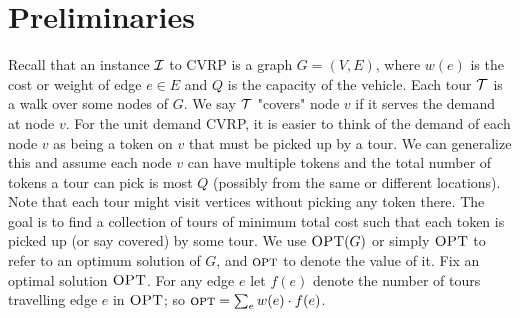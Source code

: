 \documentclass[twoside,leqno]{article}
\newcommand{\calI}{{\cal I}}
\newcommand{\calT}{{\cal T}}
\newcommand{\opt}{\mbox{\sc opt}}
\newcommand{\OPT}{\mbox{\sc OPT}}
\begin{document}
\section{Preliminaries}
Recall that an instance $\calI$ to CVRP is a graph $G = (V,E)$, where $w(e)$ is the cost or weight of edge $e \in E$ and $Q$ is the capacity of the vehicle. Each tour $\calT$ is a walk over some nodes of $G$. We say $\cal T$ "covers" node $v$ if it serves the demand at node $v$. For the unit demand CVRP, it is easier to think of the demand of each node $v$ as being a token on $v$ that must be picked up by a tour. We can generalize this and assume each node $v$ can have multiple tokens and the total number of tokens a tour can pick is most $Q$ (possibly
from the same or different locations). Note that each tour might visit vertices without picking any token there. 
The goal is to find a collection of tours of minimum total cost such that each token is picked up (or say covered) by some tour. 
We use $\OPT(G)$ or simply $\OPT$ to refer to an optimum solution of $G$, and $\opt$ to denote the value of it. Fix an optimal solution $\OPT$. For any edge $e$ let $f(e)$ denote the number of tours travelling edge $e$ in $\OPT$;
so $\opt=\sum_e w(e)\cdot f(e)$.
\end{document}
